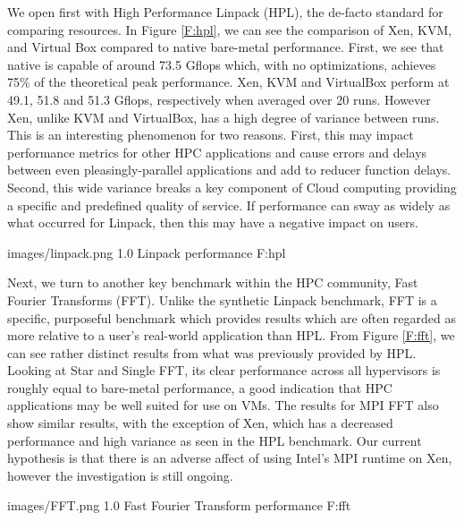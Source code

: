 We open first with High Performance Linpack (HPL), the de-facto standard for comparing resources.  In Figure \ref{F:hpl}, we can see the comparison of Xen, KVM, and Virtual Box compared to native bare-metal performance.  First, we see that native is capable of around 73.5 Gflops which, with no optimizations, achieves 75\% of the theoretical peak performance.  Xen, KVM and VirtualBox perform at 49.1, 51.8 and 51.3 Gflops, respectively when averaged over 20 runs.  However Xen, unlike KVM and VirtualBox, has a high degree of variance between runs.  This is an interesting phenomenon for two reasons.  First, this may impact performance metrics for other HPC applications and cause errors and delays between even pleasingly-parallel applications and add to reducer function delays.  Second, this wide variance breaks a key component of Cloud computing providing a specific and predefined quality of service.  If performance can sway as widely as what occurred for Linpack, then this may have a negative impact on users.   


  {images/linpack.png}
  {1.0}
  {Linpack performance}
  {F:hpl}


Next, we turn to another key benchmark within the HPC community, Fast Fourier Transforms (FFT).  Unlike the synthetic Linpack benchmark, FFT is a specific, purposeful benchmark which provides results which are often regarded as more relative to a user's real-world application than HPL.  From Figure \ref{F:fft}, we can see rather distinct results from what was previously provided by HPL. Looking at Star and Single FFT, its clear performance across all hypervisors is roughly equal to bare-metal performance, a good indication that HPC applications may be well suited for use on VMs.  The results for MPI FFT also show similar results, with the exception of Xen, which has a decreased performance and high variance as seen in the HPL benchmark.  Our current hypothesis is that there is an adverse affect of using Intel's MPI runtime on Xen, however the investigation is still ongoing.

  {images/FFT.png}
  {1.0}
  {Fast Fourier Transform performance}
  {F:fft}


